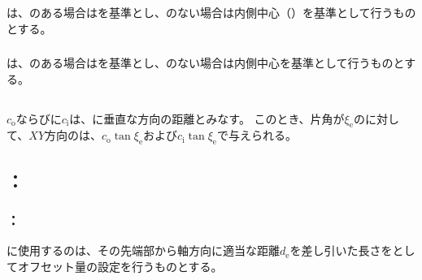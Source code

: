 \subsubsection{\EndFaceOutCChamferMillingReferencePoint}
\EndFaceOutCChamferMillingReferencePoint は、\Outcut のある場合は\OutcutCenter を基準とし、\Outcut のない場合は内側中心（\nameEndFace）を基準として行うものとする。

\subsubsection{\EndFaceInCChamferMillingReferencePoint}
\EndFaceInCChamferMillingReferencePoint は、\IncutBoring のある場合は\IncutBoringCenter を基準とし、\IncutBoring のない場合は内側中心を基準として行うものとする。


\subsection{\EndFaceCChamferMillingDimension}
\EndFaceOutCChamferLength$c_\mathrm o$ならびに\EndFaceInCChamferLength$c_\mathrm i$は、\EndFace に垂直な方向の距離とみなす。
このとき、片角が$\xi_\mathrm e$の\TaperEndMill に対して、$XY$方向の\EndFaceCChamferLength は、$c_\mathrm o\tan\xi_\mathrm e$および$c_\mathrm i\tan\xi_\mathrm e$で与えられる。


\subsection{\indexTCEndFaceCChamferMilling\nameToolCorrection：\EndFaceCChamferMilling}

\subsubsection{\indexTLCEndFaceCChamferMilling\nameTLCorrection：\EndFaceCChamferMilling}
\EndFaceCChamferMilling に使用する\indexTLTaperEndMill\nameTaperEndMill の\nameToolLength は、その先端部から軸方向に適当な距離$d_\mathrm e$を差し引いた長さを\ToolLength としてオフセット量の設定を行うものとする。


